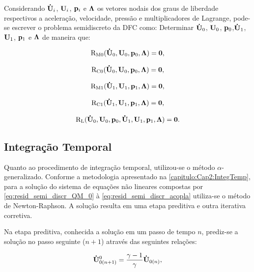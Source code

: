 Considerando $\mathbf{\dot{U}}_i$, $\mathbf{U}_i$, $\mathbf{p}_i$ e $\boldsymbol{\Lambda}$ os vetores nodais dos graus de liberdade respectivos a aceleração, velocidade, pressão e multiplicadores de Lagrange, pode-se escrever o problema semidiscreto da DFC como: Determinar $\mathbf{\dot{U}}_0$, $\mathbf{U}_0$, $\mathbf{p}_0$,$\mathbf{\dot{U}}_1$, $\mathbf{U}_1$, $\mathbf{p}_1$ e $\boldsymbol{\Lambda}$ de maneira que:

\begin{align}
	\mathrm{R}_\mathrm{M0}(\mathbf{\dot{U}}_0,\mathbf{U}_0,\mathbf{p}_0,\boldsymbol{\Lambda}) = \mathbf{0}, \label{eq:resid_semi_discr_QM_0}
\end{align}

\begin{align}
	\mathrm{R}_\mathrm{C0}(\mathbf{\dot{U}}_0,\mathbf{U}_0,\mathbf{p}_0,\boldsymbol{\Lambda}) = \mathbf{0}, 
\end{align}

\begin{align}
	\mathrm{R}_\mathrm{M1}(\mathbf{\dot{U}}_1,\mathbf{U}_1,\mathbf{p}_1,\boldsymbol{\Lambda}) = \mathbf{0},
\end{align}

\begin{align}
	\mathrm{R}_\mathrm{C1}(\mathbf{\dot{U}}_1,\mathbf{U}_1,\mathbf{p}_1,\boldsymbol{\Lambda}) = \mathbf{0},
\end{align}

\begin{align}
	\mathrm{R}_\mathrm{L}(\mathbf{\dot{U}}_0,\mathbf{U}_0,\mathbf{p}_0,\mathbf{\dot{U}}_1,\mathbf{U}_1,\mathbf{p}_1,\boldsymbol{\Lambda}) = \mathbf{0}. \label{eq:resid_semi_discr_acopla}
\end{align}

\subsection{Integração Temporal}

Quanto ao procedimento de integração temporal, utilizou-se o método $\alpha$-generalizado. Conforme a metodologia apresentado na \autoref{capitulo:Cap2:IntegTemp}, para a solução do sistema de equações não lineares compostas por \autoref{eq:resid_semi_discr_QM_0} à \autoref{eq:resid_semi_discr_acopla} utiliza-se o método de Newton-Raphson. A solução resulta em uma etapa preditiva e outra iterativa corretiva.

Na etapa preditiva, conhecida a solução em um passo de tempo $n$, prediz-se a solução no passo seguinte ($n+1$) através das seguintes relações:

\begin{align}
	\mathbf{\dot{U}}_{0(n+1)}^{0} = \frac{\gamma-1}{\gamma}\mathbf{\dot{U}}_{0(n)} \label{eq:pred_acel_0},
\end{align}


